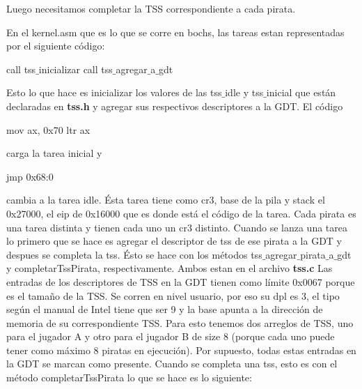 Luego necesitamos completar la TSS correspondiente a cada pirata.

En el kernel.asm que es lo que se corre en bochs, las tareas estan representadas por el siguiente código:
\begin{algorithmic}
\State call tss$\_$inicializar
\State call tss$\_$agregar$\_$a$\_$gdt
\end{algorithmic}
Esto lo que hace es inicializar los valores de las tss$\_$idle y tss$\_$inicial que están declaradas en \textbf{tss.h} y agregar sus respectivos descriptores a la GDT.
El código
\begin{algorithmic}
\State mov ax, 0x70
\State ltr ax
\end{algorithmic}
carga la tarea inicial y
\begin{algorithmic}
\State jmp 0x68:0
\end{algorithmic}
cambia a la tarea idle.
Ésta tarea tiene como cr3, base de la pila y stack el 0x27000, el eip de 0x16000 que es donde está el código de la tarea.
\newline
\newline
Cada pirata es una tarea distinta y tienen cada uno un cr3 distinto.
Cuando se lanza una tarea lo primero que se hace es agregar el descriptor de tss de ese pirata a la GDT y despues se completa la tss. Ésto se hace con los métodos tss$\_$agregar$\_$pirata$\_$a$\_$gdt y completarTssPirata, respectivamente. Ambos estan en el archivo \textbf{tss.c}
Las entradas de los descriptores de TSS en la GDT tienen como límite 0x0067 porque es el tamaño de la TSS. Se corren en nivel usuario, por eso su dpl es 3, el tipo según el manual de Intel tiene que ser 9 y la base apunta a la dirección de memoria de su correspondiente TSS. Para esto tenemos dos arreglos de TSS, uno para el jugador A y otro para el jugador B de size 8 (porque cada uno puede tener como máximo 8 piratas en ejecución). Por supuesto, todas estas entradas en la GDT se marcan como presente.
Cuando se completa una tss, esto es con el método completarTssPirata lo que se hace es lo siguiente:

